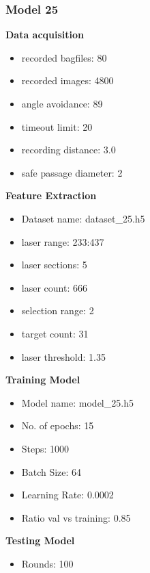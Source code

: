 \subsubsection{Model 25\label{model_25} }
\begin{multicols}{2}\textbf{Data acquisition}
\begin{itemize}
\setlength\itemsep{0.1em}
\item recorded bagfiles: 80
\item recorded images: 4800
\item angle avoidance: 89
\item timeout limit: 20
\item recording distance: 3.0
\item safe passage diameter: 2
\end{itemize}
\textbf{Feature Extraction}
\begin{itemize}
\setlength\itemsep{0.1em}
\item Dataset name: dataset\_25.h5
\item  laser range: 233:437
\item  laser sections: 5
\item  laser count: 666
\item  selection range: 2
\item  target count: 31
\item  laser threshold: 1.35
\end{itemize}
\columnbreak\textbf{Training Model}
\begin{itemize}
\setlength\itemsep{0.1em}
\item  Model name: model\_25.h5
\item  No. of epochs: 15
\item  Steps: 1000
\item  Batch Size: 64
\item  Learning Rate: 0.0002
\item  Ratio val vs training: 0.85
\end{itemize}
\textbf{Testing Model}
\begin{itemize}
\setlength\itemsep{0.1em}
\item Rounds: 100
\newline
\newline
\newline
\newline
\newline
\newline
\newline
\newline
\end{itemize}

\end{multicols}
